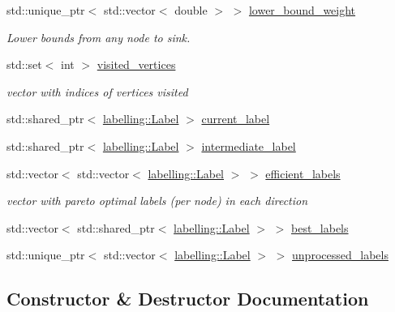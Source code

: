 \begin{DoxyCompactItemize}
std\+::unique\+\_\+ptr$<$ std\+::vector$<$ double $>$ $>$ \hyperlink{classbidirectional_1_1Search_ac06fcd122e7d2bb99e493c9a82cbecd1}{lower\+\_\+bound\+\_\+weight}
\begin{DoxyCompactList}\small\item\em Lower bounds from any node to sink. \end{DoxyCompactList}\item 
std\+::set$<$ int $>$ \hyperlink{classbidirectional_1_1Search_a7548a1928ca152017f6f4fe7a5c55089}{visited\+\_\+vertices}
\begin{DoxyCompactList}\small\item\em vector with indices of vertices visited \end{DoxyCompactList}\item 
std\+::shared\+\_\+ptr$<$ \hyperlink{classlabelling_1_1Label}{labelling\+::\+Label} $>$ \hyperlink{classbidirectional_1_1Search_a3c1bc6eaad5e1dfe7d8181b4c34db1bd}{current\+\_\+label}
\item 
std\+::shared\+\_\+ptr$<$ \hyperlink{classlabelling_1_1Label}{labelling\+::\+Label} $>$ \hyperlink{classbidirectional_1_1Search_aa7996593da90536ffce5cb681dc26a9b}{intermediate\+\_\+label}
\item 
std\+::vector$<$ std\+::vector$<$ \hyperlink{classlabelling_1_1Label}{labelling\+::\+Label} $>$ $>$ \hyperlink{classbidirectional_1_1Search_aa9159c191cdef5d5555614b9efcb8dc5}{efficient\+\_\+labels}
\begin{DoxyCompactList}\small\item\em vector with pareto optimal labels (per node) in each direction \end{DoxyCompactList}\item 
std\+::vector$<$ std\+::shared\+\_\+ptr$<$ \hyperlink{classlabelling_1_1Label}{labelling\+::\+Label} $>$ $>$ \hyperlink{classbidirectional_1_1Search_a4b87b9c1f546b3138cb1bba0cc309a80}{best\+\_\+labels}
\item 
std\+::unique\+\_\+ptr$<$ std\+::vector$<$ \hyperlink{classlabelling_1_1Label}{labelling\+::\+Label} $>$ $>$ \hyperlink{classbidirectional_1_1Search_aeb057642c57dde16fec701f625781651}{unprocessed\+\_\+labels}
\end{DoxyCompactItemize}


\subsection{Constructor \& Destructor Documentation}
\mbox{\label{classbidirectional_1_1Search_a6d5235bb92e3ca770634e5a77b55c4e4}} 

